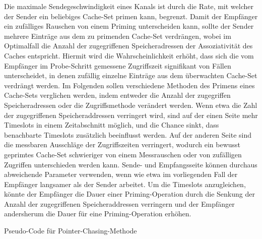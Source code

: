 Die maximale Sendegeschwindigkeit eines Kanals ist durch die Rate, mit welcher der Sender ein beliebiges Cache-Set primen kann, begrenzt.
Damit der Empfänger ein zufälliges Rauschen von einem Priming unterscheiden kann, sollte der Sender mehrere Einträge aus dem zu primenden Cache-Set verdrängen, wobei im Optimalfall die Anzahl der zugegriffenen Speicheradressen der Assoziativität des Caches entspricht.
Hiermit wird die Wahrscheinlichkeit erhöht, dass sich die vom Empfänger im Probe-Schritt gemessene Zugriffszeit signifikant von Fällen unterscheidet, in denen zufällig einzelne Einträge aus dem überwachten Cache-Set verdrängt werden. 
Im Folgenden sollen verschiedene Methoden des Primens eines Cache-Sets verglichen werden, indem entweder die Anzahl der zugegriffen Speicheradressen oder die Zugriffsmethode verändert werden.
Wenn etwa die Zahl der zugegriffenen Speicheraddressen verringert wird, sind auf der einen Seite mehr Timeslots in einem Zeitabschnitt möglich, und die Chance sinkt, dass benachbarte Timeslots zusätzlich beeinflusst werden. Auf der anderen Seite sind die messbaren Ausschläge der Zugriffszeiten verringert, wodurch ein bewusst geprimtes Cache-Set schwieriger von einem Messrauschen oder von zufälligen Zugriffen unterschieden werden kann.
Sende- und Empfangsseite können durchaus abweichende Parameter verwenden, wenn wie etwa im vorliegenden Fall der Empfänger langsamer als der Sender arbeitet. Um die Timeslots anzugleichen, könnte der Empfänger die Dauer einer Priming-Operation durch die Senkung der Anzahl der zugegriffenen Speicheraddressen verringern und der Empfänger andersherum die Dauer für eine Priming-Operation erhöhen. 

\begin{algorithm}[h]
\DontPrintSemicolon
\caption{Pseudo-Code für Pointer-Chasing-Methode}
\label{alg:pointerChasing}


\end{algorithm}

